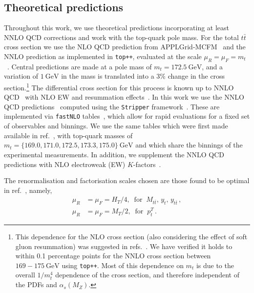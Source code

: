 \documentclass[sn-mathphys]{sn-jnl}%
\newcommand{\pT}{p^T_t}
\newcommand{\mtt}{M_{t\bar{t}}}
\newcommand{\yt}{y_{t}}
\newcommand{\ytt}{y_{t\bar{t}}}
\newcommand{\mt}{m_t}
\newcommand{\as}{\alpha_s(M_Z)}
\newcommand{\gev}{\mathrm{GeV}}
\begin{document}
\subsection{Theoretical predictions} \label{theory}
Throughout this work, we use theoretical predictions incorporating at least NNLO QCD corrections and work with the top-quark pole mass. For the total $t\bar{t}$ cross section we use the NLO QCD prediction from APPLGrid-MCFM~\cite{Carli:2010rw,Campbell:2012uf} and the NNLO prediction as implemented in \texttt{top++}, evaluated at the scale \mbox{$\mu_R=\mu_F=\mt$} ~\cite{Czakon:2011xx,Barnreuther:2012wtj,Czakon:2012zr,Czakon:2012pz,Czakon:2013goa}. Central predictions are made at a pole mass of $\mt = 172.5~\mathrm{GeV}$, and a variation of $1~\mathrm{GeV}$ in the mass is translated into a 3\% change in the cross section.\footnote{This dependence for the NLO cross section (also considering the effect of soft gluon resummation) was suggested in refs.~\cite{Catani:1996dj,Cacciari:2011hy}. We have verified it holds to within 0.1 percentage points for the NNLO cross section between $169-175~\gev$ using \texttt{top++}. Most of this dependence on $\mt$ is due to the overall $1/m_t^4$ dependence of the cross section, and therefore independent of the PDFs and $\as$.} The differential cross section for this process is known up to NNLO QCD~\cite{Catani:2019iny,Catani:2019hip} with NLO EW and resummation effects~\cite{Czakon:2017wor,Czakon:2019txp}. In this work we use the NNLO QCD predictions~\cite{Czakon:2015owf,Czakon:2016ckf,Czakon:2016dgf} computed using the \texttt{Stripper} framework~\cite{Czakon:2010td,Czakon:2014oma}. These are implemented via \texttt{fastNLO} tables~\cite{Kluge:2006xs,Britzger:2012bs,Czakon:2017dip}, which allow for rapid evaluations for a fixed set of observables and binnings. We use the same tables which were first made available in ref.~\cite{Cooper-Sarkar:2020twv}, with top-quark masses of \mbox{$\mt=\{169.0,171.0,172.5,173.3,175.0\}~\gev$} and which share the binnings of the experimental measurements. In addition, we supplement the NNLO QCD predictions with NLO electroweak (EW) $K$-factors~\cite{Czakon:2019txp}.

The renormalisation and factorisation scales chosen are those found to be optimal in ref.~\cite{Czakon:2016dgf}, namely,
%
\begin{align}
\mu_R&=\mu_F=H_T/4, \;\; \text{for} \;\; \mtt,\, \yt, \, \ytt \,, \\
\mu_R&=\mu_F=M_T/2, \;\; \text{for} \;\; \pT \,.
\end{align}
%
\end{document}
